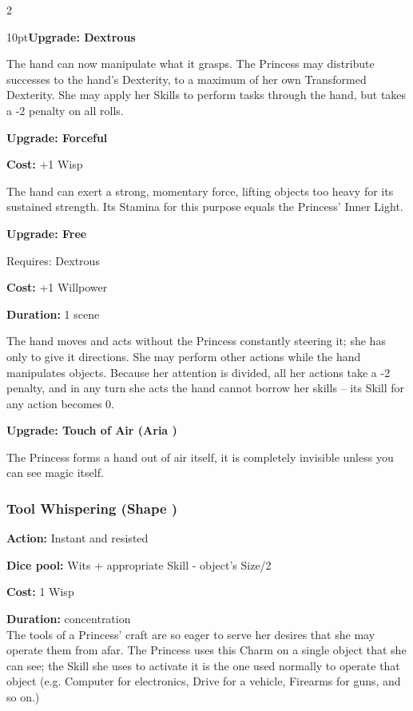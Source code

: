 \begin{multicols}{2}
\begin{myindentpar}{10pt}\textbf{Upgrade: Dextrous}

The hand can now manipulate what it grasps. The Princess may distribute successes to the hand's Dexterity, to a maximum of her own Transformed Dexterity. She may apply her Skills to perform tasks through the hand, but takes a -2 penalty on all rolls.

\textbf{Upgrade: Forceful}

\noindent \textbf{Cost:} +1 Wisp

The hand can exert a strong, momentary force, lifting objects too heavy for its sustained strength. Its Stamina for this purpose equals the Princess' Inner Light.

\textbf{Upgrade: Free}

\noindent Requires: Dextrous

\noindent \textbf{Cost:} +1 Willpower

\noindent \textbf{Duration:} 1 scene

The hand moves and acts without the Princess constantly steering it; she has only to give it directions. She may perform other actions while the hand manipulates objects. Because her attention is divided, all her actions take a -2 penalty, and in any turn she acts the hand cannot borrow her skills -- its Skill for any action becomes 0.

\textbf{Upgrade: Touch of Air (Aria \textbullet\textbullet)}

The Princess forms a hand out of air itself, it is completely invisible unless you can see magic itself.\end{myindentpar}

\subsubsection*{Tool Whispering (Shape \textbullet\textbullet)}
\noindent \textbf{Action:} Instant and resisted

\noindent \textbf{Dice pool:} Wits + appropriate Skill - object’s Size/2

\noindent \textbf{Cost:} 1 Wisp

\noindent \textbf{Duration:} concentration \\

\noindent The tools of a Princess’ craft are so eager to serve her desires that she may operate them from afar. The Princess uses this Charm on a single object that she can see; the Skill she uses to activate it is the one used normally to operate that object (e.g. Computer for electronics, Drive for a vehicle, Firearms for guns, and so on.)


\end{multicols}
